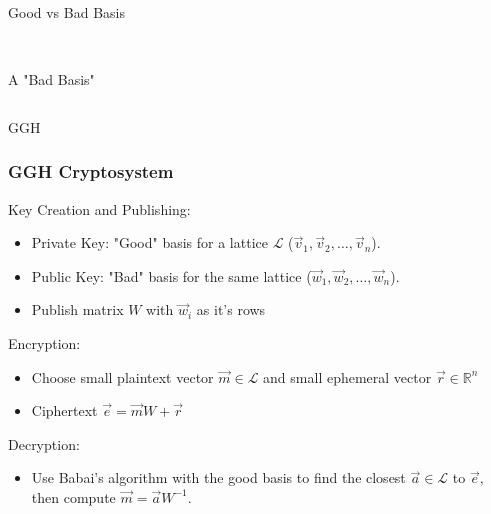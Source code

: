 \documentclass[12pt]{beamer}
\begin{document}
\begin{frame}{Good vs Bad Basis}
\begin{columns}[t]
\begin{column}{.5\textwidth}
\\
            \center A "Bad Basis"
        \end{column}
    \end{columns}
\end{frame}

\begin{frame}{GGH}
    \frametitle{GGH Cryptosystem}
    Key Creation and Publishing:
    \begin{itemize}
        \item Private Key: "Good" basis for a lattice $\mathcal{L}$ ($\vec{v}_1,\vec{v}_2,\dots,\vec{v}_n$).
        \item Public Key: "Bad" basis for the same lattice ($\vec{w}_1,\vec{w}_2,\dots,\vec{w}_n$).
        \item Publish matrix $W$ with $\vec{w}_i$ as it's rows
    \end{itemize}
    Encryption:
    \begin{itemize}
        \item Choose small plaintext vector $\vec{m}\in\mathcal{L}$ and small ephemeral vector $\vec{r}\in\mathbb{R}^n$
        \item Ciphertext $\vec{e} = \vec{m}W + \vec{r}$
    \end{itemize}
    Decryption:
    \begin{itemize}
        \item Use Babai's algorithm with the good basis to find the closest $\vec{a}\in\mathcal{L}$ to $\vec{e}$, then compute $\vec{m} = \vec{a}W^{-1}$.
    \end{itemize}
\end{frame}
\end{document}
